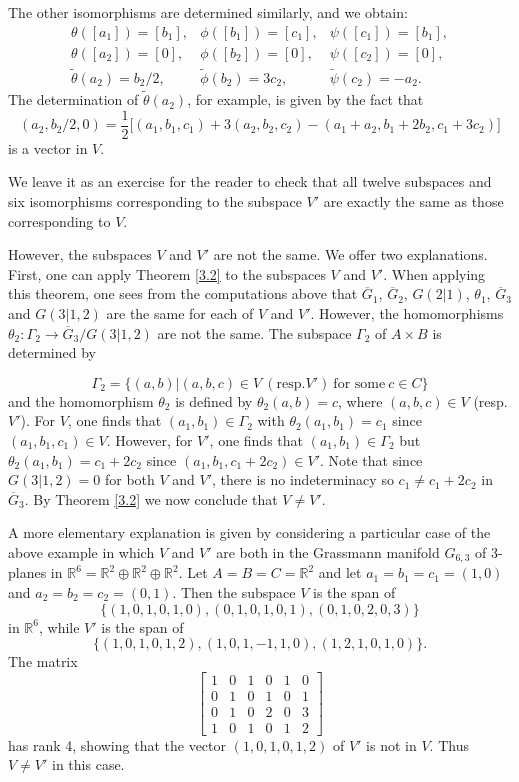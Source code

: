 \documentclass[11pt]{article}
\theoremstyle{change}
\newcommand{\<}{\langle}
\renewcommand{\>}{\rangle}
\begin{document}
The other isomorphisms are determined similarly, and we obtain:
\[ \begin{array}{ccc}
\theta([a_1]) = [b_1], & \phi([b_1])= [c_1],& \psi([c_1])= [b_1],\\
\theta([a_2]) = [0], & \phi([b_2]) =  [0],& \psi([c_2]) = [0],\\
\tilde{\theta}(a_2) = b_2/2, & \tilde{\phi}(b_2) = 3c_2,& \tilde{\psi}(c_2)=-a_2.
\end{array}
\]
The determination of $\tilde{\theta}(a_2)$, for example, is given by the fact that \[(a_2, b_2/2, 0 ) = \frac{1}{2}\Big[ (a_1, b_1, c_1)+3(a_2, b_2, c_2)-(a_1+a_2, b_1+2b_2, c_1+3c_2)\Big]\] is a vector in $V$.

We leave it as an exercise for the reader to check that all twelve subspaces and six isomorphisms corresponding to the subspace $V'$ are exactly the same as those corresponding to $V$.

However, the subspaces $V$ and $V'$ are not the same.  We offer two explanations.  First, one can apply Theorem \ref{3.2} to the subspaces $V$ and $V'$.  When applying this theorem, one sees from the computations above that $\overline{G}_1$, $\overline{G}_2$, $G(2|1)$, $\theta_1$, $\overline{G}_3$ and $G(3|1,2)$ are the same for each of $V$ and $V'$.  However, the homomorphisms $\theta_2:\Gamma_2\to \overline{G}_3/G(3|1,2)$ are not the same.  The subspace $\Gamma_2$ of $A\times B$ is determined by 




\[ \Gamma_2=\{ (a,b) |  (a,b,c)\in V \ (\text{resp.} V') \ \text{for\ some}\ c\in C\}\]
and the homomorphism $\theta_2$ is defined by $\theta_2(a,b)=c$, where $(a,b,c)\in V$ (resp. $V'$).
 For $V$, one finds that $(a_1, b_1)\in \Gamma_2$ with $\theta_2(a_1, b_1)=c_1$ since $(a_1, b_1, c_1)\in V$.  However, for $V'$, one finds that $(a_1, b_1)\in \Gamma_2$ but $\theta_2(a_1, b_1)=c_1+2c_2$ since $(a_1, b_1, c_1+2c_2)\in V'$.  Note that since $G(3|1,2)=0$ for both $V$ and $V'$, there is no indeterminacy so $c_1\neq c_1+2c_2$ in $\overline{G}_3$.  By Theorem \ref{3.2} we now conclude that $V\neq V'$.
 
 A more elementary explanation is given by considering a particular case of the above example in which $V$ and $V'$ are both in the Grassmann manifold $G_{6,3}$ of $3$-planes in ${\mathbb R}^6={\mathbb R}^2\oplus {\mathbb R}^2 \oplus {\mathbb R}^2$.  Let $A=B=C={\mathbb R}^2$ and let $a_1=b_1=c_1=(1,0)$ and $a_2=b_2=c_2=(0,1)$.  Then the subspace $V$ is the span of \[\{ (1,0,1,0,1,0), (0,1,0,1,0,1), (0,1,0,2,0,3)\}\] in ${\mathbb R}^6$, while $V'$ is the span of \[\{ (1,0,1,0,1,2), (1,0,1,-1,1,0), (1,2,1,0,1,0)\}.\]  The matrix
 \[ \left[ \begin{array}{cccccc}
 1 & 0 & 1 & 0 & 1 & 0\\
 0 & 1 & 0 & 1 & 0 & 1\\
 0 & 1 & 0 & 2 & 0 & 3\\
 1 & 0 & 1& 0 & 1 & 2
 \end{array}
 \right]\]
 has rank 4, showing that the vector $(1, 0, 1, 0, 1, 2)$ of $V'$ is not in $V$.  Thus $V\neq V'$ in this case.
\end{document}

